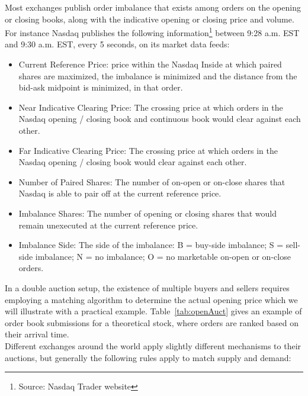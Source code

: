 Most exchanges publish order imbalance that exists among orders on the opening or closing books, along with the indicative opening or closing price and volume. For instance Nasdaq publishes the following information\footnote{Source: Nasdaq Trader website} between 9:28 a.m. EST and 9:30 a.m. EST,  every 5 seconds, on its market data feeds:
\begin{itemize}
\item  Current Reference Price: price within the Nasdaq Inside at which paired shares are maximized, the imbalance is minimized and the distance from the bid-ask midpoint is minimized, in that order.
\item  Near Indicative Clearing Price: The crossing price at which orders in the Nasdaq opening / closing book and continuous book would clear against each other. 
\item  Far Indicative Clearing Price: The crossing price at which orders in the Nasdaq opening / closing book would clear against each other. 
\item  Number of Paired Shares: The number of on-open or on-close shares that Nasdaq is able to pair off at the current reference price. 
\item  Imbalance Shares: The number of opening or closing shares that would remain unexecuted at the current reference price. 
\item  Imbalance Side: The side of the imbalance: B = buy-side imbalance; S = sell-side imbalance; N = no imbalance; O = no marketable on-open or on-close orders.
\end{itemize}



In a double auction setup, the existence of multiple buyers and sellers requires employing a matching algorithm to determine the actual opening price which we will illustrate with a practical example. Table~\ref{tab:openAuct} gives an example of order book submissions for a theoretical stock, where orders are ranked based on their arrival time.\\

Different exchanges around the world apply slightly different mechanisms to their auctions, but generally the following rules apply to match supply and demand:

